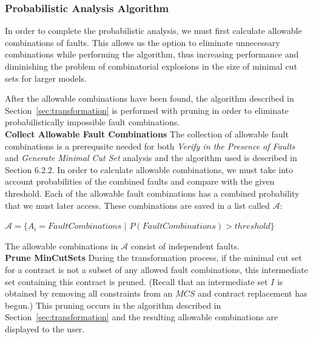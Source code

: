 \subsubsection{Probabilistic Analysis Algorithm}
\label{sec:probAlg}
In order to complete the probabilistic analysis, we must first calculate allowable combinations of faults. This allows us the option to eliminate unnecessary combinations while performing the algorithm, thus increasing performance and diminishing the problem of combinatorial explosions in the size of minimal cut sets for larger models. 

After the allowable combinations have been found, the algorithm described in Section~\ref{sec:transformation} is performed with pruning in order to eliminate probabilistically impossible fault combinations. \\

\textbf{Collect Allowable Fault Combinations}
The collection of allowable fault combinations is a prerequsite needed for both \textit{Verify in the Presence of Faults} and \textit{Generate Minimal Cut Set} analysis and the algorithm used is described in Section 6.2.2.  In order to calculate allowable combinations, we must take into account probabilities of the combined faults and compare with the given threshold. Each of the allowable fault combinations has a combined probability that we must later access. These combinations are saved in a list called $\mathcal{A}$:

$\mathcal{A} = \{A_i = FaultCombinations$ $|$  $P(FaultCombinations) > threshold\}$

The allowable combinations in $\mathcal{A}$ consist of independent faults. \\


\textbf{Prune MinCutSets}
During the transformation process, if the minimal cut set for a contract is not a subset of any allowed fault combinations, this intermediate set containing this contract is pruned. (Recall that an intermediate set $I$ is obtained by removing all constraints from an $MCS$ and contract replacement has begun.) This pruning occurs in the algorithm described in Section~\ref{sec:transformation} and the resulting allowable combinations are displayed to the user.


